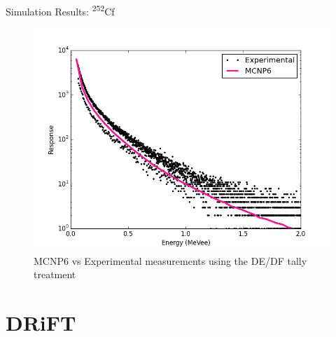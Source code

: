 \documentclass{beamer}
\begin{document}
\begin{frame}{Simulation Results: \textsuperscript{252}Cf}
\vspace*{-0.4cm}
\begin{figure}
\begin{center}
\includegraphics[scale = 0.41]{Cf252}
\vspace*{-0.4cm}
\caption{\scriptsize{MCNP6 vs Experimental measurements using the DE/DF tally treatment}}
\end{center}
\end{figure}
\end{frame}

\section{DRiFT}
\begin{frame}
\sectionpage
\end{frame}
\end{document}
